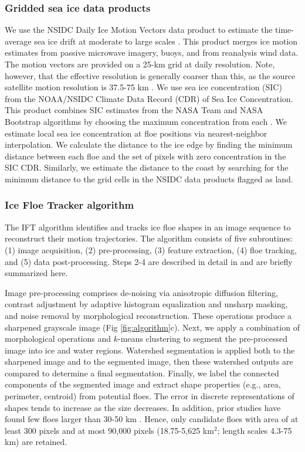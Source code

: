 \documentclass[aog]{igs}
\begin{document}
\subsubsection{Gridded sea ice data products}
We use the NSIDC Daily Ice Motion Vectors data product to estimate the time-average sea ice drift at moderate to large scales \citep{tschudi2020_EnhancementSea}.
This product merges ice motion estimates from passive microwave imagery, buoys, and from reanalysis wind data.
The motion vectors are provided on a 25-km grid at daily resolution.
Note, however, that the effective resolution is generally coarser than this, as the source satellite motion resolution is 37.5-75 km \citep{tschudi2020_EnhancementSea}. 
We use sea ice concentration (SIC) from the
{NOAA/NSIDC} Climate Data Record (CDR) of Sea Ice Concentration.
This product combines SIC estimates from the NASA Team and NASA Bootstrap algorithms by choosing the maximum concentration from each \citep{meier2021_NOAANSIDC, meier2022}.
We estimate local sea ice concentration at floe positions via nearest-neighbor interpolation.
We calculate the distance to the ice edge by finding the minimum distance between each floe and the set of pixels with zero concentration in the SIC CDR. Similarly, we estimate the distance to the coast by searching for the minimum distance to the grid cells in the NSIDC data products flagged as land.

\subsubsection{Ice Floe Tracker algorithm}
The IFT algorithm identifies and tracks ice floe shapes in an image sequence to reconstruct their motion trajectories.
The algorithm consists of five subroutines: (1) image acquisition, (2) pre-processing, (3) feature extraction, (4) floe tracking, and (5) data post-processing. Steps 2-4 are described in detail in \cite{lopez-acosta2019_IceFloe} and are briefly summarized here.

Image pre-processing comprises de-noising via anisotropic diffusion filtering, contrast adjustment by adaptive histogram equalization and  unsharp masking, and noise removal by morphological reconstruction. These operations produce a sharpened grayscale image (Fig \ref{fig:algorithm}c). Next, we apply a combination of morphological operations and $k$-means clustering to segment the pre-processed image into ice and water regions. Watershed segmentation is applied both to the sharpened image and to the segmented image, then these watershed outputs are compared to determine a final segmentation. Finally, we label the connected components of the segmented image and extract shape properties (e.g., area, perimeter, centroid) from potential floes. The error in discrete representations of shapes tends to increase as the size decreases. In addition, prior studies have found few floes larger than 30-50 km \cite{stern2018_SeasonalEvolution, stern2018_ReconcilingDisparate}. Hence, only candidate floes with area of at least 300 pixels and at most 90,000 pixels (18.75-5,625 km$^2$; length scales 4.3-75 km) are retained. 
\end{document}
